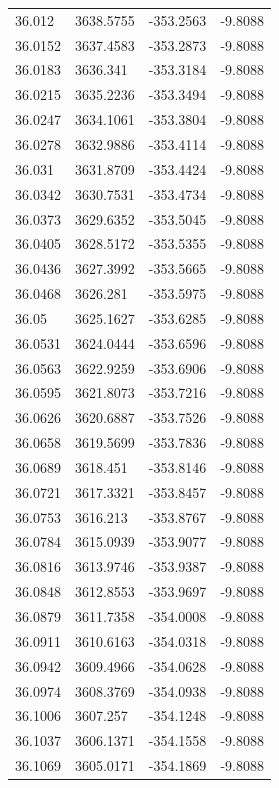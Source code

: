 \begin{table}[H]
\begin{tabular}{llll}
36.012 & 3638.5755 & -353.2563 & -9.8088 \\
36.0152 & 3637.4583 & -353.2873 & -9.8088 \\
36.0183 & 3636.341 & -353.3184 & -9.8088 \\
36.0215 & 3635.2236 & -353.3494 & -9.8088 \\
36.0247 & 3634.1061 & -353.3804 & -9.8088 \\
36.0278 & 3632.9886 & -353.4114 & -9.8088 \\
36.031 & 3631.8709 & -353.4424 & -9.8088 \\
36.0342 & 3630.7531 & -353.4734 & -9.8088 \\
36.0373 & 3629.6352 & -353.5045 & -9.8088 \\
36.0405 & 3628.5172 & -353.5355 & -9.8088 \\
36.0436 & 3627.3992 & -353.5665 & -9.8088 \\
36.0468 & 3626.281 & -353.5975 & -9.8088 \\
36.05 & 3625.1627 & -353.6285 & -9.8088 \\
36.0531 & 3624.0444 & -353.6596 & -9.8088 \\
36.0563 & 3622.9259 & -353.6906 & -9.8088 \\
36.0595 & 3621.8073 & -353.7216 & -9.8088 \\
36.0626 & 3620.6887 & -353.7526 & -9.8088 \\
36.0658 & 3619.5699 & -353.7836 & -9.8088 \\
36.0689 & 3618.451 & -353.8146 & -9.8088 \\
36.0721 & 3617.3321 & -353.8457 & -9.8088 \\
36.0753 & 3616.213 & -353.8767 & -9.8088 \\
36.0784 & 3615.0939 & -353.9077 & -9.8088 \\
36.0816 & 3613.9746 & -353.9387 & -9.8088 \\
36.0848 & 3612.8553 & -353.9697 & -9.8088 \\
36.0879 & 3611.7358 & -354.0008 & -9.8088 \\
36.0911 & 3610.6163 & -354.0318 & -9.8088 \\
36.0942 & 3609.4966 & -354.0628 & -9.8088 \\
36.0974 & 3608.3769 & -354.0938 & -9.8088 \\
36.1006 & 3607.257 & -354.1248 & -9.8088 \\
36.1037 & 3606.1371 & -354.1558 & -9.8088 \\
36.1069 & 3605.0171 & -354.1869 & -9.8088 \\

\end{tabular}
\end{table}
